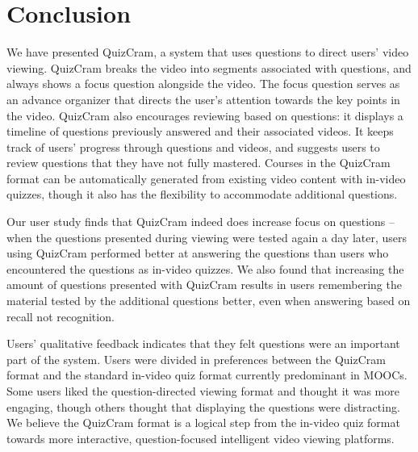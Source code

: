 \documentclass{chi-ext}
\begin{document}
\section{Conclusion}
We have presented QuizCram, a system that uses questions to direct users' video viewing. QuizCram breaks the video into segments associated with questions, and always shows a focus question alongside the video. The focus question serves as an advance organizer that directs the user's attention towards the key points in the video. QuizCram also encourages reviewing based on questions: it displays a timeline of questions previously answered and their associated videos. It keeps track of users' progress through questions and videos, and suggests users to review questions that they have not fully mastered. Courses in the QuizCram format can be automatically generated from existing video content with in-video quizzes, though it also has the flexibility to accommodate additional questions.

Our user study finds that QuizCram indeed does increase focus on questions -- when the questions presented during viewing were tested again a day later, users using QuizCram performed better at answering the questions than users who encountered the questions as in-video quizzes. We also found that increasing the amount of questions presented with QuizCram results in users remembering the material tested by the additional questions better, even when answering based on recall not recognition.

Users' qualitative feedback indicates that they felt questions were an important part of the system. Users were divided in preferences between the QuizCram format and the standard in-video quiz format currently predominant in MOOCs. Some users liked the question-directed viewing format and thought it was more engaging, though others thought that displaying the questions were distracting. We believe the QuizCram format is a logical step from the in-video quiz format towards more interactive, question-focused intelligent video viewing platforms.


\balance



\end{document}
